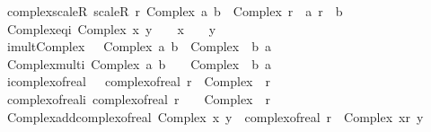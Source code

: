 \begin{isabellebody}
\ \ \ \ \ complex{\isacharunderscore}{\kern0pt}scaleR{\isacharcolon}{\kern0pt}\ {\isachardoublequoteopen}scaleR\ r\ {\isacharparenleft}{\kern0pt}Complex\ a\ b{\isacharparenright}{\kern0pt}\ {\isacharequal}{\kern0pt}\ Complex\ {\isacharparenleft}{\kern0pt}r\ {\isacharasterisk}{\kern0pt}\ a{\isacharparenright}{\kern0pt}\ {\isacharparenleft}{\kern0pt}r\ {\isacharasterisk}{\kern0pt}\ b{\isacharparenright}{\kern0pt}{\isachardoublequoteclose}\isanewline
\ \ \ \ \ Complex{\isacharunderscore}{\kern0pt}eq{\isacharunderscore}{\kern0pt}i{\isacharcolon}{\kern0pt}\ {\isachardoublequoteopen}Complex\ x\ y\ {\isacharequal}{\kern0pt}\ {\isasymi}\ {\isasymlongleftrightarrow}\ x\ {\isacharequal}{\kern0pt}\ {}\ {\isasymand}\ y\ {\isacharequal}{\kern0pt}\ {}{\isachardoublequoteclose}\isanewline
\ \ \ \ \ i{\isacharunderscore}{\kern0pt}mult{\isacharunderscore}{\kern0pt}Complex{\isacharcolon}{\kern0pt}\ {\isachardoublequoteopen}{\isasymi}\ {\isacharasterisk}{\kern0pt}\ Complex\ a\ b\ {\isacharequal}{\kern0pt}\ Complex\ {\isacharparenleft}{\kern0pt}{\isacharminus}{\kern0pt}\ b{\isacharparenright}{\kern0pt}\ a{\isachardoublequoteclose}\isanewline
\ \ \ \ \ Complex{\isacharunderscore}{\kern0pt}mult{\isacharunderscore}{\kern0pt}i{\isacharcolon}{\kern0pt}\ {\isachardoublequoteopen}Complex\ a\ b\ {\isacharasterisk}{\kern0pt}\ {\isasymi}\ {\isacharequal}{\kern0pt}\ Complex\ {\isacharparenleft}{\kern0pt}{\isacharminus}{\kern0pt}\ b{\isacharparenright}{\kern0pt}\ a{\isachardoublequoteclose}\isanewline
\ \ \ \ \ i{\isacharunderscore}{\kern0pt}complex{\isacharunderscore}{\kern0pt}of{\isacharunderscore}{\kern0pt}real{\isacharcolon}{\kern0pt}\ {\isachardoublequoteopen}{\isasymi}\ {\isacharasterisk}{\kern0pt}\ complex{\isacharunderscore}{\kern0pt}of{\isacharunderscore}{\kern0pt}real\ r\ {\isacharequal}{\kern0pt}\ Complex\ {}\ r{\isachardoublequoteclose}\isanewline
\ \ \ \ \ complex{\isacharunderscore}{\kern0pt}of{\isacharunderscore}{\kern0pt}real{\isacharunderscore}{\kern0pt}i{\isacharcolon}{\kern0pt}\ {\isachardoublequoteopen}complex{\isacharunderscore}{\kern0pt}of{\isacharunderscore}{\kern0pt}real\ r\ {\isacharasterisk}{\kern0pt}\ {\isasymi}\ {\isacharequal}{\kern0pt}\ Complex\ {}\ r{\isachardoublequoteclose}\isanewline
\ \ \ \ \ Complex{\isacharunderscore}{\kern0pt}add{\isacharunderscore}{\kern0pt}complex{\isacharunderscore}{\kern0pt}of{\isacharunderscore}{\kern0pt}real{\isacharcolon}{\kern0pt}\ {\isachardoublequoteopen}Complex\ x\ y\ {\isacharplus}{\kern0pt}\ complex{\isacharunderscore}{\kern0pt}of{\isacharunderscore}{\kern0pt}real\ r\ {\isacharequal}{\kern0pt}\ Complex\ {\isacharparenleft}{\kern0pt}x{\isacharplus}{\kern0pt}r{\isacharparenright}{\kern0pt}\ y{\isachardoublequoteclose}\isanewline

\end{isabellebody}
